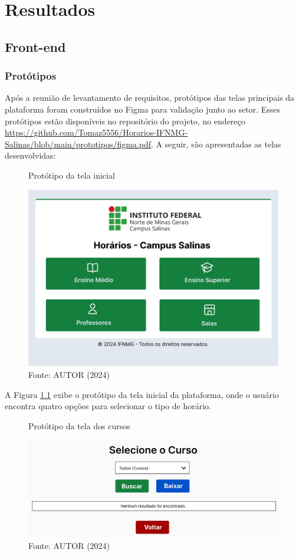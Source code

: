 \chapter{Resultados} 
\label{cap5_resultados}

\section{Front-end}

\subsection{Protótipos}

Após a reunião de levantamento de requisitos, protótipos das telas principais da plataforma foram construídos no Figma para validação junto ao setor. Esses protótipos estão disponíveis no repositório do projeto, no endereço \url{https://github.com/Tomaz5556/Horarios-IFNMG-Salinas/blob/main/prototipos/figma.pdf}. A seguir, são apresentadas as telas desenvolvidas:

\begin{figure}[htb]
    \centering
    \caption{Protótipo da tela inicial}
    \includegraphics[width=1\textwidth]{Figuras/proto-1.png}
    \caption*{Fonte: AUTOR (2024)}
    \label{fig_proto_1}
\end{figure}

A Figura \ref{fig_proto_1} exibe o protótipo da tela inicial da plataforma, onde o usuário encontra quatro opções para selecionar o tipo de horário.

\begin{figure}[H]
    \centering
    \caption{Protótipo da tela dos cursos}
    \includegraphics[width=1\textwidth]{Figuras/proto-2.PNG}
    \caption*{Fonte: AUTOR (2024)}
    \label{fig_proto_2}
\end{figure}

